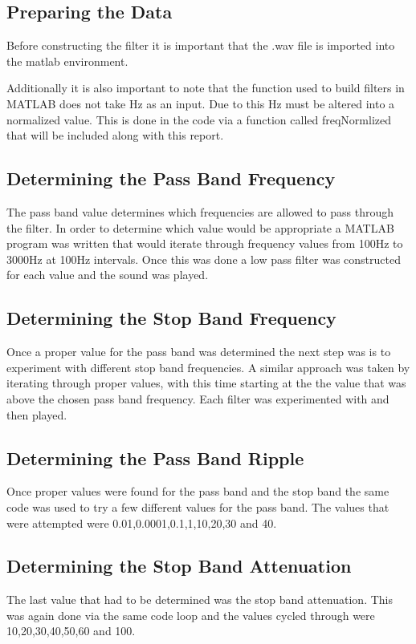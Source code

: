 \documentclass[conference]{IEEEtran}
\begin{document}
\subsection{Preparing the Data}
Before constructing the filter it is important that the .wav file is imported into the matlab environment.

Additionally it is also important to note that the function used to build filters in MATLAB does not take Hz as an input. Due to this Hz must be altered into a normalized value. This is done in the code via a function called freqNormlized that will be included along with this report.

\subsection{Determining the Pass Band Frequency}
The pass band value determines which frequencies are allowed to pass through the filter. In order to determine which value would be appropriate a MATLAB program was written that would iterate through frequency values from 100Hz to 3000Hz at 100Hz intervals. Once this was done a low pass filter was constructed for each value and the sound was played. 

\subsection{Determining the Stop Band Frequency}
Once a proper value for the pass band was determined the next step was is to experiment with different stop band frequencies. A similar approach was taken by iterating through proper values, with this time starting at the the value that was above the chosen pass band frequency. Each filter was experimented with and then played. 

\subsection{Determining the Pass Band Ripple}
Once proper values were found for the pass band and the stop band the same code was used to try a few different values for the pass band. The values that were attempted were 0.01,0.0001,0.1,1,10,20,30 and 40.

\subsection{Determining the Stop Band Attenuation}
The last value that had to be determined was the stop band attenuation. This was again done via the same code loop and the values cycled through were 10,20,30,40,50,60 and 100.
\end{document}
